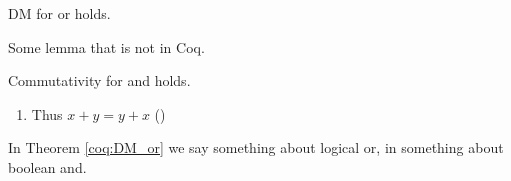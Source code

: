 \documentclass[a4paper,UKenglish,cleveref]{lipics-v2019}
\begin{document}
\begin{theorem}[][DM_or]
  DM for or holds.
\end{theorem}

\begin{lemma}[Name]
  Some lemma that is not in Coq.
\end{lemma}

\begin{lemma}
  Commutativity for and holds.
\end{lemma}

\begin{lemma}
  \begin{enumerate}
  \coqitem[plus_O] $x + 0 = x$
  \coqitem[plus_S] $x + S y = S (x + y)$
  \item Thus $x + y = y + x$ ()
\end{enumerate}
\end{lemma}

In Theorem \ref{coq:DM_or} we say something about logical or, in
 something about boolean and.
\end{document}
